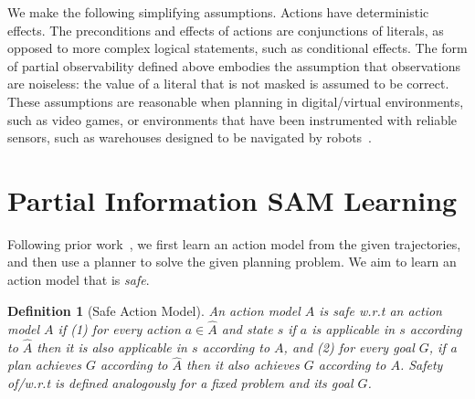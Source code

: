 \documentclass[letterpaper]{article} %
\newtheorem{definition}{Definition}
\begin{document}
We make the following simplifying assumptions. 
Actions have deterministic effects. 
The preconditions and effects of actions are conjunctions of literals, as opposed to more complex logical statements, such as conditional effects. 
The form of partial observability defined above embodies the assumption that observations are noiseless: the value of a literal that is not masked is assumed to be correct. 
These assumptions are reasonable when planning in digital/virtual environments, such as video games, or environments that have been instrumented with reliable sensors, such as warehouses designed to be navigated by robots~\citep{li2020lifelong}. 






\section{Partial Information SAM Learning}
Following prior work~\citep{stern2017efficientAndSafe,juba2021safe}, 
we first learn an action model from the given trajectories, and then use a planner to solve the given planning problem. 
We aim to learn an action model that is \emph{safe}. 
\begin{definition}[Safe Action Model]
An action model $\hat{A}$ is safe w.r.t an action model $A$ 
if (1) for every action $a\in\hat{A}$ and state $s$ if $a$ is applicable in $s$ according to $\hat{A}$ then it is also applicable in $s$ according to $A$, 
and (2) for every goal $G$, if a plan achieves $G$ according to $\hat{A}$ then it also achieves $G$ according to $A$. Safety of/w.r.t is defined analogously for a fixed problem and its goal $G$.
\label{def:safe-action-model}
\end{definition}

\end{document}
